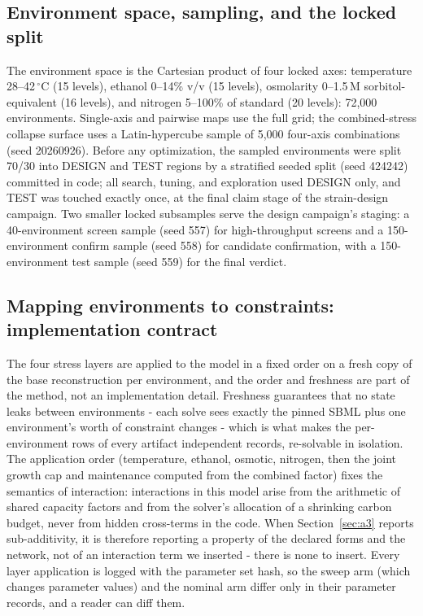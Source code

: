 \documentclass[12pt]{article}
\begin{document}
\subsection{Environment space, sampling, and the locked split}

The environment space is the Cartesian product of four locked axes:
temperature 28--42\,$^{\circ}$C (15 levels), ethanol 0--14\% v/v (15
levels), osmolarity 0--1.5\,M sorbitol-equivalent (16 levels), and
nitrogen 5--100\% of standard (20 levels): 72{,}000 environments.
Single-axis and pairwise maps use the full grid; the combined-stress
collapse surface uses a Latin-hypercube sample of 5{,}000 four-axis
combinations (seed 20260926). Before any optimization, the sampled
environments were split 70/30 into DESIGN and TEST regions by a
stratified seeded split (seed 424242) committed in code; all search,
tuning, and exploration used DESIGN only, and TEST was touched exactly
once, at the final claim stage of the strain-design campaign. Two smaller
locked subsamples serve the design campaign's staging: a 40-environment
screen sample (seed 557) for high-throughput screens and a
150-environment confirm sample (seed 558) for candidate confirmation,
with a 150-environment test sample (seed 559) for the final verdict.


\subsection{Mapping environments to constraints: implementation contract}

The four stress layers are applied to the model in a fixed order on a
fresh copy of the base reconstruction per environment, and the order
and freshness are part of the method, not an implementation detail.
Freshness guarantees that no state leaks between environments - each
solve sees exactly the pinned SBML plus one environment's worth of
constraint changes - which is what makes the per-environment rows of
every artifact independent records, re-solvable in isolation. The
application order (temperature, ethanol, osmotic, nitrogen, then the
joint growth cap and maintenance computed from the combined factor)
fixes the semantics of interaction: interactions in this model arise
from the arithmetic of shared capacity factors and from the solver's
allocation of a shrinking carbon budget, never from hidden cross-terms
in the code. When Section~\ref{sec:a3} reports sub-additivity, it is
therefore reporting a property of the declared forms and the network,
not of an interaction term we inserted - there is none to insert.
Every layer application is logged with the parameter set hash, so the
sweep arm (which changes parameter values) and the nominal arm differ
only in their parameter records, and a reader can diff them.
\end{document}
